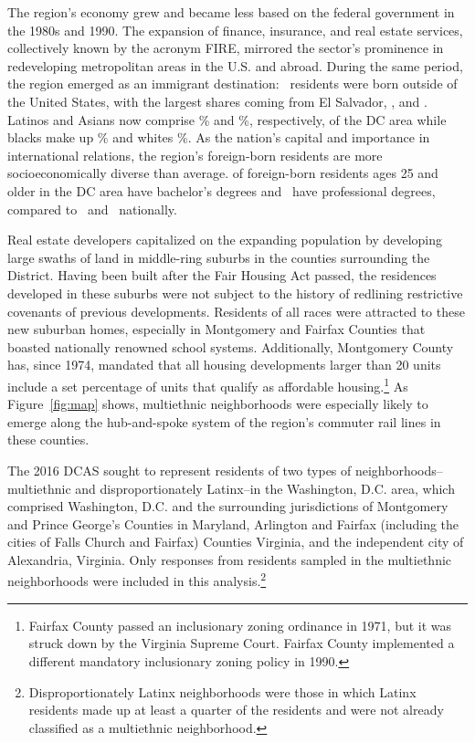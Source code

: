 \documentclass{baderart}
\newcommand{\TK}[1][]{\strong{TK #1}}
\begin{document}
The region's economy grew and became less based on the federal government in the 1980s and 1990. The expansion of finance, insurance, and real estate services, collectively known by the acronym FIRE, mirrored the sector's prominence in redeveloping metropolitan areas in the U.S. and abroad. During the same period, the region emerged as an immigrant destination: \TK\ residents were born outside of the United States, with the largest shares coming from El Salvador, \TK, and \TK. Latinos and Asians now comprise \TK\% and \TK\%, respectively, of the DC area while blacks make up \TK\% and whites \TK\%. As the nation's capital and importance in international relations, the region's foreign-born residents are more socioeconomically diverse than average. \TK[\%] of foreign-born residents ages 25 and older in the DC area have bachelor's degrees and \TK[\%]\ have professional degrees, compared to \TK[\%]\ and \TK[\%]\ nationally. 

Real estate developers capitalized on the expanding population by developing large swaths of land in middle-ring suburbs in the counties surrounding the District. Having been built after the Fair Housing Act passed, the residences developed in these suburbs were not subject to the history of redlining restrictive covenants of previous developments. Residents of all races were attracted to these new suburban homes, especially in Montgomery and Fairfax Counties that boasted nationally renowned school systems. Additionally, Montgomery County has, since 1974, mandated that all housing developments larger than 20 units include a set percentage of units that qualify as affordable housing.\footnote{Fairfax County passed an inclusionary   zoning ordinance in 1971, but it was struck down by the Virginia   Supreme Court. Fairfax County implemented a different mandatory   inclusionary zoning policy in 1990.} As Figure~\ref{fig:map} shows, multiethnic neighborhoods were especially likely to emerge along the hub-and-spoke system of the region's commuter rail lines in these counties.


The 2016 DCAS sought to represent residents of two types of neighborhoods--multiethnic and disproportionately Latinx--in the Washington, D.C. area, which comprised Washington, D.C. and the surrounding jurisdictions of Montgomery and Prince George's Counties in Maryland, Arlington and Fairfax (including the cities of Falls Church and Fairfax) Counties Virginia, and the independent city of Alexandria, Virginia. Only responses from residents sampled in the multiethnic neighborhoods were included in this analysis.\footnote{Disproportionately   Latinx neighborhoods were those in which Latinx residents made up at   least a quarter of the residents and were not already classified as a   multiethnic neighborhood.}
\end{document}
